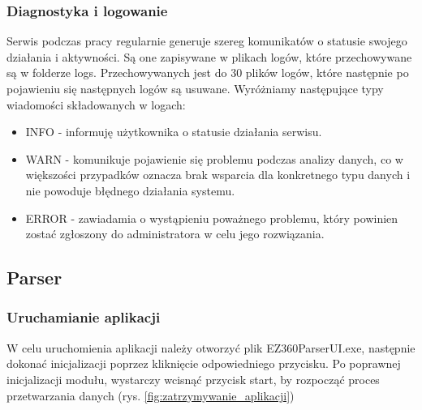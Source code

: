 \documentclass[a4paper]{book}
\begin{document}
\subsubsection{Diagnostyka i logowanie}
Serwis podczas pracy regularnie generuje szereg komunikatów o statusie swojego działania i aktywności.
Są one zapisywane w plikach logów, które przechowywane są w folderze logs. Przechowywanych jest do 30 plików logów, które następnie po pojawieniu się następnych logów są usuwane.
Wyróżniamy następujące typy wiadomości składowanych w logach:
\begin{itemize}
	\item INFO - informuję użytkownika o statusie działania serwisu.
	\item WARN - komunikuje pojawienie się problemu podczas analizy danych, co w większości przypadków oznacza brak wsparcia dla konkretnego typu danych i nie powoduje błędnego działania systemu.
	\item ERROR - zawiadamia o wystąpieniu poważnego problemu, który powinien zostać zgłoszony do administratora w celu jego rozwiązania.
\end{itemize}
\subsection{Parser}
\subsubsection{Uruchamianie aplikacji}
W celu uruchomienia aplikacji należy otworzyć plik EZ360ParserUI.exe, następnie dokonać inicjalizacji poprzez kliknięcie odpowiedniego przycisku.
Po poprawnej inicjalizacji modułu, wystarczy wcisnąć przycisk start, by rozpocząć proces przetwarzania danych (rys. \ref{fig:zatrzymywanie_aplikacji})
\end{document}
